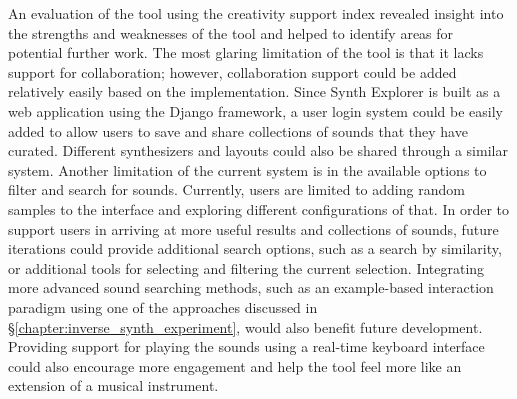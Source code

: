 An evaluation of the tool using the creativity support index revealed insight into the strengths and weaknesses of the tool and helped to identify areas for potential further work. The most glaring limitation of the tool is that it lacks support for collaboration; however, collaboration support could be added relatively easily based on the implementation. Since Synth Explorer is built as a web application using the Django framework, a user login system could be easily added to allow users to save and share collections of sounds that they have curated. Different synthesizers and layouts could also be shared through a similar system. Another limitation of the current system is in the available options to filter and search for sounds. Currently, users are limited to adding random samples to the interface and exploring different configurations of that. In order to support users in arriving at more useful results and collections of sounds, future iterations could provide additional search options, such as a search by similarity, or additional tools for selecting and filtering the current selection. Integrating more advanced sound searching methods, such as an example-based interaction paradigm using one of the approaches discussed in \S\ref{chapter:inverse_synth_experiment}, would also benefit future development. Providing support for playing the sounds using a real-time keyboard interface could also encourage more engagement and help the tool feel more like an extension of a musical instrument.